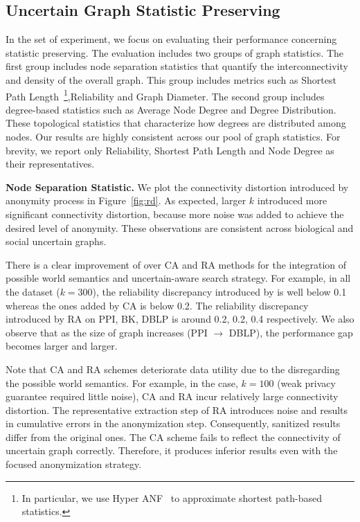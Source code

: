 \subsection{Uncertain Graph Statistic Preserving}
In the set of experiment, we focus on evaluating their performance concerning statistic preserving. 
The evaluation includes two groups of graph statistics. 
The first group includes node separation statistics that quantify the interconnectivity and density of the overall graph.   
This group includes metrics such as Shortest Path Length~\footnote{In particular, we use Hyper ANF~\cite{Boldi_Rosa_Vigna_2011} to approximate shortest path-based statistics.},Reliability and Graph Diameter. 
The second group includes degree-based statistics such as Average  Node Degree and Degree Distribution.
These topological statistics that characterize how degrees are distributed among nodes. 
Our results are highly consistent across our pool of graph statistics.
For brevity, we report only Reliability, Shortest Path Length and Node Degree as their representatives. 

\textbf{Node Separation Statistic.} 
We plot the connectivity distortion introduced by anonymity process in Figure~\ref{fig:rd}.  
As expected, larger $k$ introduced more significant connectivity distortion, because more noise was added to achieve the desired level of anonymity.   
These observations are consistent across biological and social uncertain graphs.

There is a clear improvement of {\methodName} over CA and RA methods for the integration of possible world semantics and uncertain-aware search strategy. 
For example, in all the dataset ($k=300$), the reliability discrepancy introduced by {\methodName} is well below 0.1 whereas the ones added by CA is below 0.2. The reliability discrepancy introduced by RA on PPI, BK, DBLP is around 0.2, 0.2, 0.4 respectively. We also observe that as the size of graph increases (PPI $\rightarrow$ DBLP), the performance gap becomes larger and larger.

Note that CA and RA schemes deteriorate data utility due to the disregarding the possible world semantics. 
For example, in the case, $k=100$ (weak privacy guarantee required little noise), CA and RA incur relatively large connectivity distortion. 
The representative extraction step of RA introduces noise and results in cumulative errors in the anonymization step. Consequently, sanitized results differ from the original ones. 
The CA scheme fails to reflect the connectivity of uncertain graph correctly. Therefore, it produces inferior results even with the focused anonymization strategy. 


